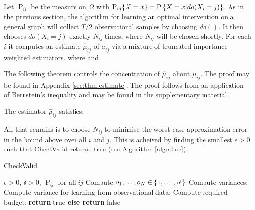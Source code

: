 Let $\operatorname P_{ij}$ be the measure on $\Omega$ with $\operatorname{P}_{ij}\!\left\{X = x\right\} = \operatorname{P}\left\{X = x|do(X_i = j)\right\}$.
As in the previous section, the algorithm for learning an optimal intervention on a general graph will 
collect $T/2$ observational samples by choosing $do()$. It then chooses $do(X_i = j)$ 
exactly $N_{ij}$ times, where $N_{ij}$ will be chosen shortly. For each $i$ it computes an estimate $\hat \mu_{ij}$ of $\mu_{ij}$ via
a mixture of truncated importance weighted estimators.
where 
and

The following theorem controls the concentration of $\hat \mu_{ij}$ about $\mu_{ij}$. 
\ifsup
The proof may be found in Appendix \ref{sec:thm:estimate}.
\else
The proof follows from an application of Bernstein's inequality and may be found in the supplementary material.
\fi

\begin{theorem}\label{thm:estimate}
The estimator $\hat \mu_{ij}$ satisfies:
\end{theorem}


All that remains is to choose $N_{ij}$ to minimise the worst-case approximation error in the bound above over all $i$ and $j$.
This is acheived by finding the smallest $\epsilon > 0$ such that {\sc CheckValid} returns true (see Algorithm \ref{alg:alloc}).

\begin{algorithm}[H]
\caption{CheckValid}\label{alg:alloc}
\begin{algorithmic}
 $\epsilon > 0$, $\delta > 0$, $\operatorname P_{ij}$ for all $ij$
\STATE Compute $o_1,\ldots,o_N \in \left\{1,\ldots,N\right\}$
\STATE Compute variances:
\STATE Compute variance for learning from observational data:
\STATE Compute required budget: 
\ENDFOR
{} {\bf return} true {\bf else return} false
\end{algorithmic}
\end{algorithm}

